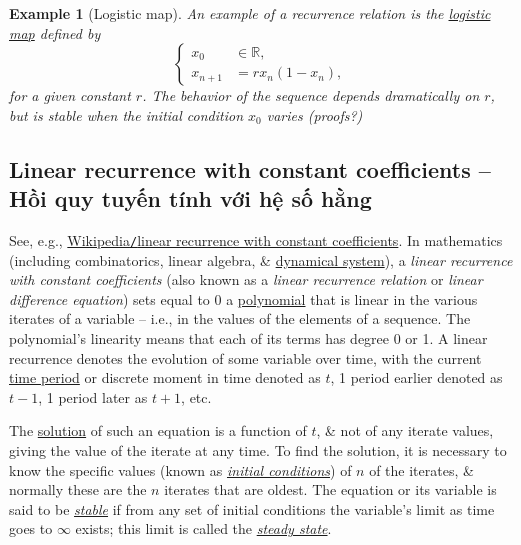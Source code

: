 \documentclass{article}
\newtheorem{example}{Example}
\begin{document}
\begin{example}[Logistic map]
	An example of a recurrence relation is the \href{https://en.wikipedia.org/wiki/Logistic_map}{logistic map} defined by
	\begin{equation}
		\label{logistic map}
		\tag{lgt}
		\left\{\begin{split}
			x_0&\in\mathbb{R},\\
			x_{n+1} &= rx_n(1 - x_n),
		\end{split}\right.
	\end{equation}
	for a given constant $r$. The behavior of the sequence depends dramatically on $r$, but is stable when the initial condition $x_0$ varies (proofs?)
\end{example}


\subsection{Linear recurrence with constant coefficients -- Hồi quy tuyến tính với hệ số hằng}
See, e.g., \href{https://en.wikipedia.org/wiki/Linear_recurrence_with_constant_coefficients}{Wikipedia{\tt/}linear recurrence with constant coefficients}. In mathematics (including combinatorics, linear algebra, \& \href{https://en.wikipedia.org/wiki/Dynamical_systems}{dynamical system}), a {\it linear recurrence with constant coefficients} (also known as a {\it linear recurrence relation} or {\it linear difference equation}) sets equal to 0 a \href{https://en.wikipedia.org/wiki/Polynomial}{polynomial} that is linear in the various iterates of a variable -- i.e., in the values of the elements of a sequence. The polynomial's linearity means that each of its terms has degree 0 or 1. A linear recurrence denotes the evolution of some variable over time, with the current \href{https://en.wikipedia.org/wiki/Discrete_time}{time period} or discrete moment in time denoted as $t$, 1 period earlier denoted as $t - 1$, 1 period later as $t + 1$, etc.

The \href{https://en.wikipedia.org/wiki/Equation_solving}{solution} of such an equation is a function of $t$, \& not of any iterate values, giving the value of the iterate at any time. To find the solution, it is necessary to know the specific values (known as \href{https://en.wikipedia.org/wiki/Initial_condition}{\it initial conditions}) of $n$ of the iterates, \& normally these are the $n$ iterates that are oldest. The equation or its variable is said to be \href{https://en.wikipedia.org/wiki/Lyapunov_stability#Definition_for_discrete-time_systems}{\it stable} if from any set of initial conditions the variable's limit as time goes to $\infty$ exists; this limit is called the \href{https://en.wikipedia.org/wiki/Steady_state}{\it steady state}.
\end{document}
